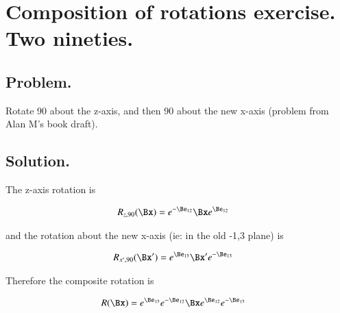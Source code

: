 
%
%




\chapter{Composition of rotations exercise.  Two nineties. }

%

\section{Problem. }

Rotate 90 about the z-axis, and then 90 about the new x-axis (problem from Alan M's book draft).

\section{Solution. }

The z-axis rotation is 

\begin{align*}
R_{z,90}(\Bx) &= e^{-\Be_{12}} \Bx e^{\Be_{12}}
\end{align*}

and the rotation about the new x-axis (ie: in the old -1,3 plane) is

\begin{align*}
R_{x',90}(\Bx') &= e^{\Be_{13}} \Bx' e^{-\Be_{13}}
\end{align*}

Therefore the composite rotation is

\begin{align*}
R(\Bx) &= e^{\Be_{13}} e^{-\Be_{12}} \Bx e^{\Be_{12}} e^{-\Be_{13}}
\end{align*}

